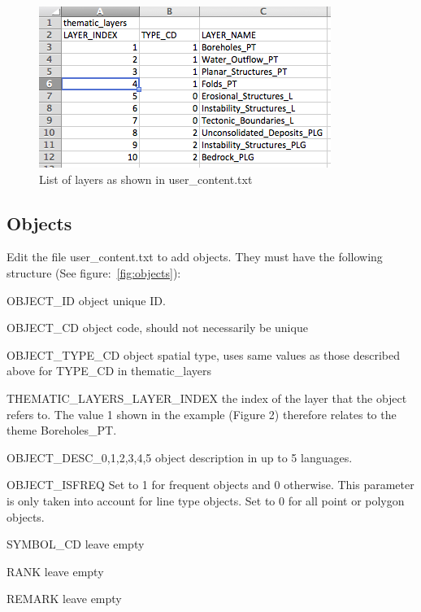 \documentclass[a4paper, 12pt]{article}
\begin{document}
\begin{figure} [hbp]
	\centering
    \includegraphics[width=.6\textwidth]{img/layers.png}
    \caption{List of layers as shown in user\_content.txt}
    \label{fig:layers}
\end{figure}

\subsection{Objects}
\label{sec:objects}

Edit the file user\_content.txt to add objects. They must have the following structure (See figure:~\ref{fig:objects}):
\begin{description*}
  \item [OBJECT\_ID] object unique ID.
  \item [OBJECT\_CD] object code, should not necessarily be unique
  \item [OBJECT\_TYPE\_CD] object spatial type, uses same values as those described above for TYPE\_CD in thematic\_layers
  \item [THEMATIC\_LAYERS\_LAYER\_INDEX] the index of the layer that the object refers to. The value 1 shown in the example (Figure 2) therefore relates to the theme Boreholes\_PT.
  \item [OBJECT\_DESC\_0,1,2,3,4,5] object description in up to 5 languages.
  \item [OBJECT\_ISFREQ] Set to 1 for frequent objects and 0 otherwise. This parameter is only taken into account for line type objects. Set to 0 for all point or polygon objects.
  \item [SYMBOL\_CD] leave empty
  \item [RANK] leave empty
  \item [REMARK] leave empty
\end{description*}
\end{document}
